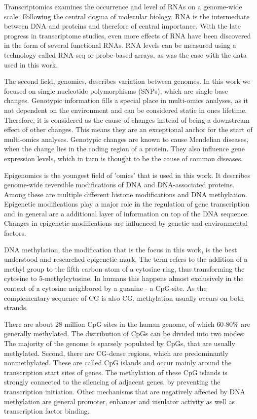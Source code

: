 \documentclass[a4paper,12pt,twoside,openright]{report}
\begin{document}
Transcriptomics examines the occurrence and level of RNAs on a genome-wide scale. Following the central dogma of molecular biology, RNA is the intermediate between DNA and proteins and therefore of central importance\cite{}. With the late progress in transcriptome studies, even more effects of RNA have been discovered in the form of several functional RNAs\cite{10.3389/fgene.2015.00002}. RNA levels can be measured using a technology called RNA-seq\cite{Wang2009} or probe-based arrays\cite{Schulze2001}, as was the case with the data used in this work. 

The second field, genomics, describes variation between genomes. In this work we focused on single nucleotide polymorphisms (SNPs), which are single base changes. Genotypic information fills a special place in multi-omics analyses, as it not dependent on the environment and can be considered static in ones lifetime. Therefore, it is considered as the cause of changes instead of being a downstream effect of other changes\cite{Hasin2017}. This means they are an exceptional anchor for the start of multi-omics analyses. 
Genotypic changes are known to cause Mendelian diseases, when the change lies in the coding region of a protein. They also influence gene expression levels, which in turn is thought to be the cause of common diseases\cite{Hasin2017}.

Epigenomics is the youngest field of 'omics' that is used in this work. It describes genome-wide reversible modifications of DNA and DNA-associated proteins. Among these are multiple different histone modifications and DNA methylation. Epigenetic modifications play a major role in the regulation of gene transcription\cite{Piuntiaad9780,Deaton2011} and in general are a additional layer of information on top of the DNA sequence. Changes in epigenetic modifications are influenced by genetic and environmental factors\cite{Hasin2017}.

DNA methylation, the modification that is the focus in this work, is the best understood and researched epigenetic mark\cite{Smith2013}. The term refers to the addition of a methyl group to the fifth carbon atom of a cytosine ring, thus transforming the cytosine to 5-methylcytosine. In humans this happens almost exclusively in the context of a cytosine neighbored by a guanine - a CpG-site. As the complementary sequence of CG is also CG, methylation usually occurs on both strands. 

There are about 28 million CpG sites in the human genome, of which 60-80\% are generally methylated\cite{Smith2013}. The distribution of CpGs can be divided into two modes: The majority of the genome is sparsely populated by CpGs, that are usually methylated. Second, there are CG-dense regions, which are predominantly nonmethylated. These are called CpG islands and occur mainly around the transcription start sites of genes\cite{Deaton2011}. The methylation of these CpG islands is strongly connected to the silencing of adjacent genes, by preventing the transcription initiation\cite{Deaton2011}. Other mechanisms that are negatively affected by DNA methylation are general promoter, enhancer and insulator activity as well as transcription factor binding\cite{Smith2013}. 
\end{document}
